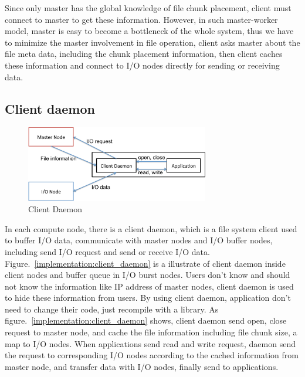 Since only master has the global knowledge of file chunk placement, client must connect to master
to get these information.
However, in such master-worker model, master is easy to become a bottleneck of the whole system,
thus we have to minimize the master involvement in file operation, client asks master about the
file meta data, including the chunk placement information, then client caches these information and
connect to I/O nodes directly for sending or receiving data.

\subsection{Client daemon}

\begin{figure}[tb]
	\centering
	\includegraphics[width=8cm]{img/client_daemon}
	\caption{Client Daemon}
	\label{implementaion:client_daemon}
\end{figure}

In each compute node, there is a client daemon, which is a file system client used to buffer I/O
data, communicate with master nodes and I/O buffer nodes, including send I/O request and send or
receive I/O data.
Figure.~\ref{implementation:client_daemon} is a illustrate of client daemon inside client nodes and
buffer queue in I/O burst nodes.
Users don't know and should not know the information like IP address of master nodes,  client daemon
is used to hide these information from users.
By using client daemon, application don't need to change their code, just recompile with a library.
As figure.~\ref{implementation:client_daemon} shows, client daemon send open, close request to master node, and cache the file information including file chunk size, a map to I/O nodes.
When applications send read and write request, daemon send the request to corresponding I/O nodes
according to the cached information from master node, and transfer data with I/O nodes, finally
send to applications.


